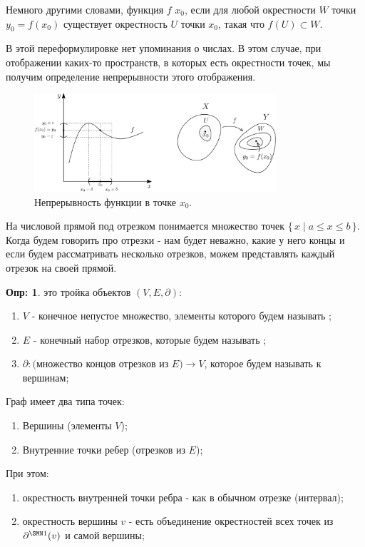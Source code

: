 \documentclass[12pt]{article}
\theoremstyle{definition}
\newtheorem{defn}{Опр:}
\begin{document}
Немного другими словами, функция $f$  $x_0$, если для любой окрестности $W$ точки $y_0 = f(x_0)$ существует окрестность $U$ точки $x_0$, такая что $f(U) \subset W$.

В этой переформулировке нет упоминания о числах. В этом случае, при отображении каких-то пространств, в которых есть окрестности точек, мы получим определение непрерывности этого отображения.

\begin{figure}[H]
	\centering
	\includegraphics[width=0.8\textwidth]{1_5.png}
	\caption{Непрерывность функции в точке $x_0$.}
	\label{1_5}
\end{figure}

На числовой прямой под отрезком понимается множество точек $\{\,x \mid  a\leq x \leq b \,\}$. Когда будем говорить про отрезки - нам будет неважно, какие у него концы и если будем рассматривать несколько отрезков, можем представлять каждый отрезок на своей прямой.

\begin{defn}
	 это тройка объектов $(V,E,\partial)$:
	\begin{enumerate}[label ={(\arabic*)}]
		\item $V$ - конечное непустое множество, элементы которого будем называть ;
		\item $E$ - конечный набор отрезков, которые будем называть ;
		\item $\partial \colon \text{(множество концов отрезков из } E ) \to V$, которое будем называть  к вершинам;
	\end{enumerate}
	Граф имеет два типа точек: 
	\begin{enumerate}[label ={(\arabic*)}]
		\item Вершины (элементы $V$);
		\item Внутренние точки ребер (отрезков из $E$);
	\end{enumerate}
	При этом:
	\begin{enumerate}[label ={(\arabic*)}]
		\item окрестность внутренней точки ребра - как в обычном отрезке (интервал);
		\item окрестность вершины $v$ - есть объединение окрестностей всех точек из $\partial^{\SMN1}(v)$ и самой вершины; 
	\end{enumerate}
\end{defn}
\end{document}
